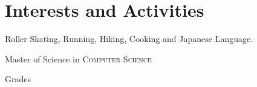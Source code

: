 \documentclass[a4paper,10pt]{article} %
\begin{document}

\section{Interests and Activities}

Roller Skating, Running, Hiking, Cooking and Japanese Language.


\newpage


\par{\centering\Large \hypertarget{grds_ms}{Master of Science in \textsc{Computer Science}}\par}
\large{\centering Grades\par}\normalsize
\end{document}
